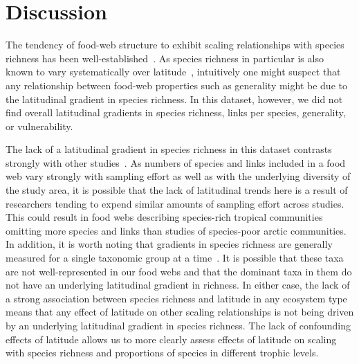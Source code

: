 \documentclass[12pt]{article}
\begin{document}
\section*{Discussion}

  The tendency of food-web structure to exhibit scaling relationships with
  species richness has been well-established~\cite{Dunne2004,Riede2010}. As
  species richness in particular is also known to vary systematically over
  latitude~\cite{Kaufman1995,Macpherson2002,Hillebrand2004,Schemske2009},
  intuitively one might suspect that any relationship between food-web
  properties such as generality might be due to the latitudinal gradient in
  species richness. In this dataset, however, we did not find overall
  latitudinal gradients in species richness, links per species, generality, or
  vulnerability.


  The lack of a latitudinal gradient in species richness in this dataset
  contrasts strongly with other
  studies~\cite{Kaufman1995,Macpherson2002,Hillebrand2004,Schemske2009}. As
  numbers of species and links included in a food web vary strongly with
  sampling effort as well as with the underlying diversity of the study area,
  it is possible that the lack of latitudinal trends here is a result of
  researchers tending to expend similar amounts of sampling effort across
  studies. This could result in food webs describing species-rich tropical
  communities omitting more species and links than studies of species-poor arctic
  communities. In addition, it is worth noting that gradients in species
  richness are generally measured for a single taxonomic group at a
  time~\cite{Kaufman1995,Macpherson2002,Hillebrand2004,Schemske2009}. It is possible
  that these taxa are not well-represented in our food webs and that the
  dominant taxa in them do not have an underlying latitudinal gradient in
  richness. In either case, the lack of a strong association between species
  richness and latitude in any ecosystem type means that any effect of
  latitude on other scaling relationships is not being driven by an underlying
  latitudinal gradient in species richness. The lack of confounding effects of
  latitude allows us to more clearly assess effects of latitude on scaling
  with species richness and proportions of species in different trophic
  levels.
\end{document}

